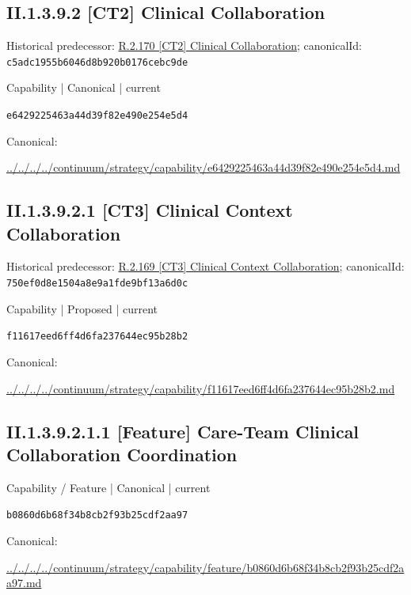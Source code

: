 \documentclass[10pt,a4paper]{article}
\begin{document}
\subsection*{II.1.3.9.2 [CT2] Clinical Collaboration}
Historical predecessor: \hyperref[element-c5adc1955b6046d8b920b0176cebc9de]{R.2.170 [CT2] Clinical Collaboration}; canonicalId: \texttt{c5adc1955b6046d8b920b0176cebc9de}\par
\label{element-e6429225463a44d39f82e490e254e5d4}
{\small Capability | Canonical | current}\par
\texttt{e6429225463a44d39f82e490e254e5d4}\par
Canonical: \par
{\footnotesize\url{../../../../continuum/strategy/capability/e6429225463a44d39f82e490e254e5d4.md}}\par
\subsection*{II.1.3.9.2.1 [CT3] Clinical Context Collaboration}
Historical predecessor: \hyperref[element-750ef0d8e1504a8e9a1fde9bf13a6d0c]{R.2.169 [CT3] Clinical Context Collaboration}; canonicalId: \texttt{750ef0d8e1504a8e9a1fde9bf13a6d0c}\par
\label{element-f11617eed6ff4d6fa237644ec95b28b2}
{\small Capability | Proposed | current}\par
\texttt{f11617eed6ff4d6fa237644ec95b28b2}\par
Canonical: \par
{\footnotesize\url{../../../../continuum/strategy/capability/f11617eed6ff4d6fa237644ec95b28b2.md}}\par
\subsection*{II.1.3.9.2.1.1 [Feature] Care-Team Clinical Collaboration Coordination}
\label{element-b0860d6b68f34b8cb2f93b25cdf2aa97}
{\small Capability / Feature | Canonical | current}\par
\texttt{b0860d6b68f34b8cb2f93b25cdf2aa97}\par
Canonical: \par
{\footnotesize\url{../../../../continuum/strategy/capability/feature/b0860d6b68f34b8cb2f93b25cdf2aa97.md}}\par
\end{document}
